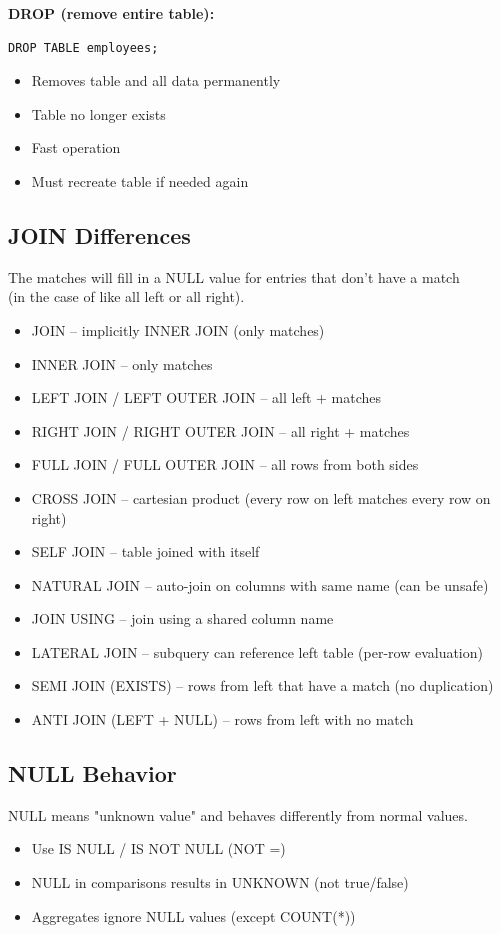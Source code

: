 \documentclass[10pt]{article}
\begin{document}
\textbf{DROP (remove entire table):}

\begin{verbatim}
DROP TABLE employees;
\end{verbatim}

\begin{itemize}
    \item Removes table and all data permanently
    \item Table no longer exists
    \item Fast operation
    \item Must recreate table if needed again
\end{itemize}

\newpage
\subsection{JOIN Differences}
The matches will fill in a NULL value for entries that don't have a match\\ 
(in the case of like all left or all right).
\begin{itemize}
\item JOIN -- implicitly INNER JOIN (only matches)
\item INNER JOIN -- only matches
\item LEFT JOIN / LEFT OUTER JOIN -- all left + matches
\item RIGHT JOIN / RIGHT OUTER JOIN -- all right + matches
\item FULL JOIN / FULL OUTER JOIN -- all rows from both sides
\item CROSS JOIN -- cartesian product (every row on left matches every row on right)
\item SELF JOIN -- table joined with itself
\item NATURAL JOIN -- auto-join on columns with same name (can be unsafe)
\item JOIN USING -- join using a shared column name
\item LATERAL JOIN -- subquery can reference left table (per-row evaluation)
\item SEMI JOIN (EXISTS) -- rows from left that have a match (no duplication)
\item ANTI JOIN (LEFT + NULL) -- rows from left with no match
\end{itemize}

\subsection{NULL Behavior}
NULL means "unknown value" and behaves differently from normal values.
\begin{itemize}
\item Use IS NULL / IS NOT NULL (NOT =)
\item NULL in comparisons results in UNKNOWN (not true/false)
\item Aggregates ignore NULL values (except COUNT(*))
\end{itemize}
\end{document}
